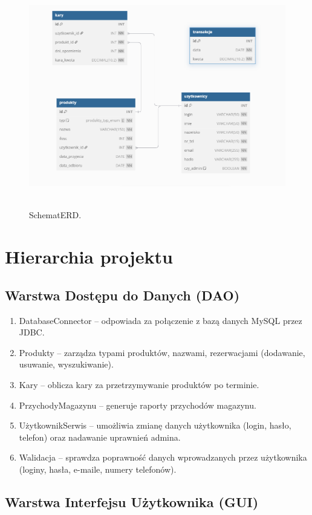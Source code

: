 \begin{figure}[H]
    \centering
    \includegraphics[width=.9\linewidth]{figures/SchematERD.png}\
    \caption{SchematERD.\label{schematERD}}
\end{figure}

\section{Hierarchia projektu}
\label{sec:Hierarchia projektu}

\subsection{Warstwa Dostępu do Danych (DAO)}
\label{subsec:warstwa-dao}

\begin{enumerate}
    \item DatabaseConnector – odpowiada za połączenie z bazą danych MySQL przez JDBC.
    \item Produkty – zarządza typami produktów, nazwami, rezerwacjami (dodawanie, usuwanie, wyszukiwanie).
    \item Kary – oblicza kary za przetrzymywanie produktów po terminie.
    \item PrzychodyMagazynu – generuje raporty przychodów magazynu.
    \item UżytkownikSerwis – umożliwia zmianę danych użytkownika (login, hasło, telefon) oraz nadawanie uprawnień admina.
    \item Walidacja – sprawdza poprawność danych wprowadzanych przez użytkownika (loginy, hasła, e-maile, numery telefonów).
\end{enumerate}

\subsection{Warstwa Interfejsu Użytkownika (GUI)}
\label{subsec:warstwa-gui}

